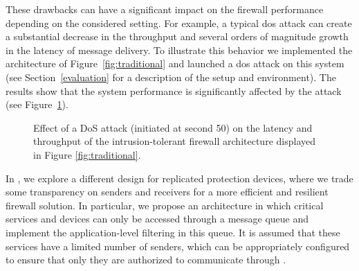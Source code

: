 These drawbacks can have a significant impact on the firewall performance depending on the considered setting. 
For example, a typical \gls{dos} attack can create a substantial decrease in the throughput and several orders of magnitude growth in the latency of message delivery. 
To illustrate this behavior we implemented the architecture of Figure~\ref{fig:traditional} and launched a \gls{dos} attack on this system (see Section~\ref{evaluation} for a description of the setup and environment). 
The results show that the system performance is significantly affected by the attack (see Figure~\ref{fig:attack_traditional}).


\begin{figure}[h]
\begin{center}
\hspace{-5mm}
\caption{\small Effect of a DoS attack (initiated at second 50) on the latency and throughput of the intrusion-tolerant firewall architecture displayed in Figure \ref{fig:traditional}.}
\label{fig:attack_traditional}
\end{center}
\end{figure}

In \sieveq, we explore a different design for replicated protection devices, where we trade some transparency on senders and receivers for a more efficient and resilient firewall solution.
In particular, we propose an architecture in which critical services and devices can only be accessed through a message queue and implement the application-level filtering in this queue.
It is assumed that these services have a limited number of senders, which can be appropriately configured to ensure that only they are authorized to communicate through \sieveq.

